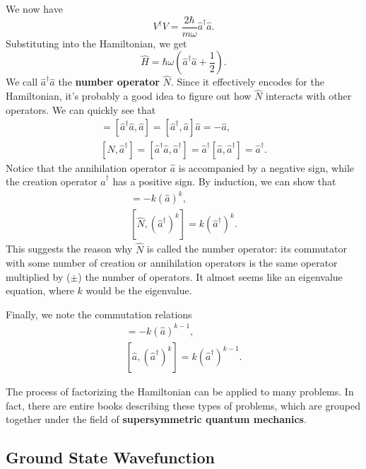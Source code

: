 We now have $$V^\dagger V=\frac{2\hbar}{m\omega}\hat{a}^\dagger\hat{a}.$$Substituting into the Hamiltonian, we get $$\boxed{\hat{H}=\hbar\omega(\hat{a}^\dagger\hat{a}+\frac{1}{2}).}$$We call $\hat{a}^\dagger\hat{a}$ the \textbf{number operator} $\hat{N}$. Since it effectively encodes for the Hamiltonian, it's probably a good idea to figure out how $\hat{N}$ interacts with other operators. We can quickly see that \begin{align*} [\hat{N},\hat{a}]=[\hat{a}^\dagger\hat{a},\hat{a}]=[\hat{a}^\dagger,\hat{a}]\hat{a}=-\hat{a},\\ [\hat{N},\hat{a}^\dagger]=[\hat{a}^\dagger\hat{a},\hat{a}^\dagger]=\hat{a}^\dagger[\hat{a},\hat{a}^\dagger]=\hat{a}^\dagger. \end{align*}Notice that the annihilation operator $\hat{a}$ is accompanied by a negative sign, while the creation operator $\hat{a}^\dagger$ has a positive sign. By induction, we can show that \begin{align*}[\hat{N},(\hat{a})^k]=-k(\hat{a})^k,\\ [\hat{N},(\hat{a}^\dagger)^k]=k(\hat{a}^\dagger)^k.\end{align*}This suggests the reason why $\hat{N}$ is called the number operator: its commutator with some number of creation or annihilation operators is the same operator multiplied by ($\pm$) the number of operators. It almost seems like an eigenvalue equation, where $k$ would be the eigenvalue.

Finally, we note the commutation relations \begin{align*}[\hat{a}^\dagger,(\hat{a})^k]=-k(\hat{a})^{k-1},\\ [\hat{a},(\hat{a}^\dagger)^k]=k(\hat{a}^\dagger)^{k-1}.\end{align*}

\begin{framedrmk*}
    The process of factorizing the Hamiltonian can be applied to many problems. In fact, there are entire books describing these types of problems, which are grouped together under the field of \textbf{supersymmetric quantum mechanics}.
\end{framedrmk*}

\subsection{Ground State Wavefunction}\label{ground_state_harmonic}

